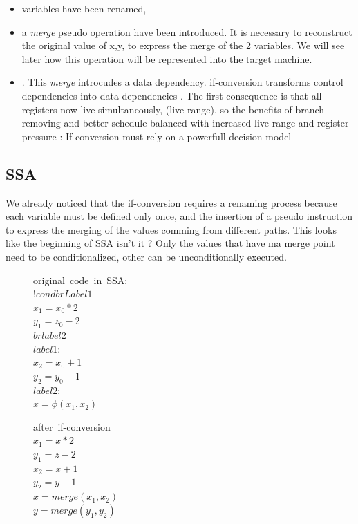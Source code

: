 \begin{itemize}
\item variables have been renamed, 
\item a \textit{merge} pseudo operation have been introduced. It is necessary to reconstruct the original value of x,y, to express the merge of the 2 variables. We will see later how this operation will be represented into the target machine.
\item. This \textit{merge} introcudes a data dependency. if-conversion transforms control dependencies into data dependencies \cite{Allen:1983:CCD:567067.567085}. The first consequence is that all registers now live simultaneously, (live range), so the benefits of branch removing and better schedule balanced with increased live range and register pressure : If-conversion must rely on a powerfull decision model
\end{itemize}

\subsection{SSA}

We already noticed that the if-conversion requires a renaming process because each variable must be defined only once, and the insertion of a pseudo instruction to express the merging of the values comming from different paths. This looks like the beginning of SSA isn't it ?
Only the values that have ma merge point need to be conditionalized, other can be unconditionally executed.

\begin{figure}
\begin{minipage}[t]{4cm}
\mbox{original code in SSA:} \\
$ !cond br Label1 $ \\
$ x_1 = x_0 * 2 $ \\
$ y_1 = z_0 - 2 $ \\
$ br label2 $ \\
$ label1: $ \\
$ x_2 = x_0 + 1 $ \\
$ y_2 = y_0 - 1 $ \\
$ label2: $ \\
$ x = \phi (x_1,x_2) $ \\
\end{minipage} 
\begin{minipage}[t]{4cm} 
\mbox{after if-conversion} \\
$ x_1 = x * 2 $ \\
$ y_1 = z - 2 $ \\
$ x_2 = x + 1 $ \\
$ y_2 = y - 1 $ \\
$ x = \textit{merge}(x_1,x_2) $ \\
$ y = \textit{merge}(y_1,y_2) $ \\
\end{minipage}
\end{figure}

